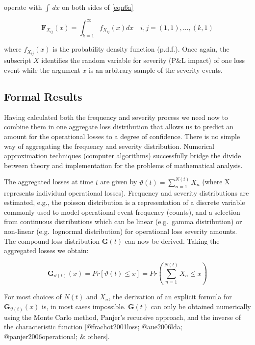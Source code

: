\documentclass[]{article}
\begin{document}
\begin{itemize}
operate with $\int\,dx$ on both sides of \ref{eqn6a}

\singlespacing
\begin{equation}
\mathbf{F}_{X_{ij}}(x)=\int_{k=1}^{\infty} f_{X_{ij}}(x)dx \quad{i,j}= (1,1),\ldots, (k,1)\label{eqn6b}
\end{equation}
\doublespacing

where $f_{X_{ij}}(x)$ is the probability density function (p.d.f.). Once again, the subscript $X$ identifies the random variable for severity (P\&L impact) of one loss event while the argument $x$ is an arbitrary sample of the severity events.
\end{itemize}

\subsection{Formal Results}

Having calculated both the frequency and severity process we need now to
combine them in one aggregate loss distribution that allows us to
predict an amount for the operational losses to a degree of confidence.
There is no simple way of aggregating the frequency and severity
distribution. Numerical approximation techniques (computer algorithms)
successfully bridge the divide between theory and implementation for the
problems of mathematical analysis.\medskip

The aggregated losses at time \(t\) are given by
\(\vartheta(t) = \sum_{n=1}^{N(t)} X_{n}\) (where X represents
individual operational losses). Frequency and severity distributions are
estimated, e.g., the poisson distribution is a representation of a
discrete variable commonly used to model operational event frequency
(counts), and a selection from continuous distributions which can be
linear (e.g.~gamma distribution) or non-linear (e.g.~lognormal
distribution) for operational loss severity amounts. The compound loss
distribution \(\mathbf{G}(t)\) can now be derived. Taking the aggregated
losses we obtain:

\singlespacing

\begin{equation}\label{Compound_losses}
\mathbf{G}_{\vartheta(t)}(x)=Pr[\vartheta(t)\leq x]=Pr\left(\sum_{n=1}^{N(t)}X_{n} \leq x\right)
\end{equation} \doublespacing

For most choices of \(N(t)\) and \(X_{n}\), the derivation of an
explicit formula for \(\mathbf{G}_{\vartheta(t)}(x)\) is, in most cases
impossible. \(\mathbf{G}(t)\) can only be obtained numerically using the
Monte Carlo method, Panjer's recursive approach, and the inverse of the
characteristic function {[}@frachot2001loss; @aue2006lda;
@panjer2006operational; \& others{]}. \medskip
\end{document}
